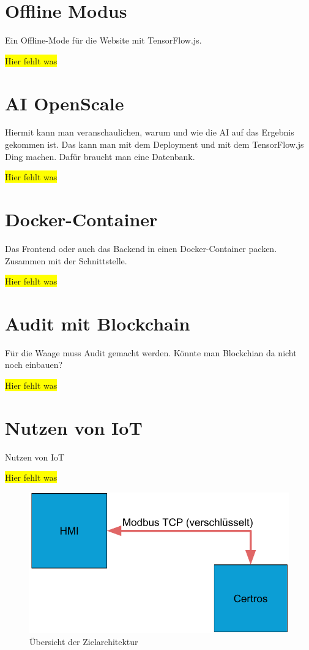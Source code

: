 \section{Offline Modus}
Ein Offline-Mode für die Website mit TensorFlow.js.

\colorbox{yellow}{Hier fehlt was}

\section{AI OpenScale}
Hiermit kann man veranschaulichen, warum und wie die AI auf das Ergebnis gekommen ist. Das kann man mit dem Deployment
und mit dem TensorFlow.js Ding machen. Dafür braucht man eine Datenbank.

\colorbox{yellow}{Hier fehlt was}

\section{Docker-Container}
Das Frontend oder auch das Backend in einen Docker-Container packen. Zusammen mit der Schnittstelle.

\colorbox{yellow}{Hier fehlt was}

\section{Audit mit Blockchain}
Für die Waage muss Audit gemacht werden. Könnte man Blockchian da nicht noch einbauen?

\colorbox{yellow}{Hier fehlt was}

\section{Nutzen von IoT}
Nutzen von IoT

\colorbox{yellow}{Hier fehlt was}

\begin{figure}[h]
    \centering
    \includegraphics[width=\textwidth]{images/kapitel_6/iot_waage.pdf}
    \caption{Übersicht der Zielarchitektur}
    \label{fig:ausblick_iot}
\end{figure}


